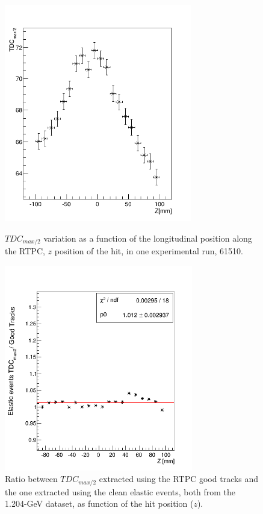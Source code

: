 \begin{figure}[tpb]
\begin{minipage}[c]{.46\linewidth}
\hspace*{-0.3in}
\includegraphics[height=9.5cm]{fig_rtpc/RunNumber_61551_TDCmax_Zslice.png}
 \caption{$TDC_{max/2}$ variation as a function of the longitudinal position 
 along the RTPC, $z$ position of the hit, in one experimental run, 61510.} 
 \label{fig:RunNumber_61551_TDCmax_Zslice}
\end{minipage} \hfill
\begin{minipage}[c]{.46\linewidth}
\hspace*{-0.3in}
\includegraphics[height=9.0cm]{fig_rtpc/TDCmax_ratio_final.png}
\caption{Ratio between $TDC_{max/2}$ extracted using the RTPC good tracks and 
the one extracted using the clean elastic events, both from the 1.204-GeV 
dataset, as function of the hit position ($z$).}
\label{fig:TDCmax_ratio}
\end{minipage}
\end{figure}

